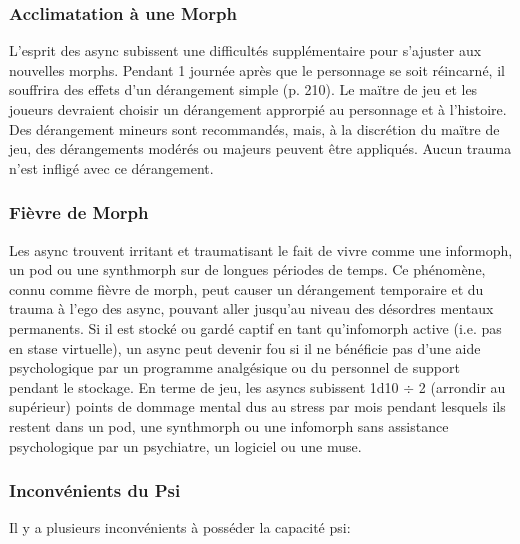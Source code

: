 \subsubsection{Acclimatation à une Morph} 

L'esprit des async subissent une difficultés supplémentaire pour s'ajuster aux nouvelles morphs. Pendant 1 journée après que le personnage se soit réincarné, il souffrira des effets d'un dérangement simple (p. 210). Le maïtre de jeu et les joueurs devraient choisir un dérangement approrpié au personnage et à l'histoire. Des dérangement mineurs sont recommandés, mais, à la discrétion du maïtre de jeu, des dérangements modérés ou majeurs peuvent être appliqués. Aucun trauma n'est infligé avec ce dérangement. 

\subsubsection{Fièvre de Morph} 

Les async trouvent irritant et traumatisant le fait de vivre comme une informoph, un pod ou une synthmorph  sur de longues périodes de temps. Ce phénomène, connu comme fièvre de morph, peut causer un dérangement temporaire et du trauma à l'ego des async, pouvant aller jusqu'au niveau des désordres mentaux permanents. Si il est stocké ou gardé captif en tant qu'infomorph active (i.e. pas en stase virtuelle), un async peut devenir fou si il ne bénéficie pas d'une aide psychologique par un programme analgésique ou du personnel de support pendant le stockage. En terme de jeu, les asyncs subissent 1d10 $\div$ 2 (arrondir au supérieur) points de dommage mental dus au stress par mois pendant lesquels  ils restent dans un pod, une synthmorph ou une infomorph sans assistance psychologique par un psychiatre, un logiciel ou une muse. 

\subsubsection{Inconvénients du Psi} 

Il y a plusieurs inconvénients à posséder la capacité psi: 

